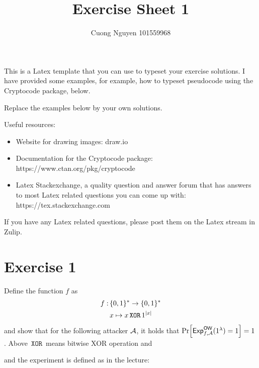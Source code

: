 \documentclass{article}      	%
\author{Cuong Nguyen 101559968}
\title{Exercise Sheet 1}
\newcommand{\xor}{\, \texttt{XOR} \,} %
\begin{document}
         
\maketitle

This is a Latex template that you can use to typeset your exercise solutions. I have provided some examples, for example, how to typeset pseudocode using the Cryptocode package, below.

Replace the examples below by your own solutions.

Useful resources:
\begin{itemize}
    \item Website for drawing images: draw.io
    \item Documentation for the Cryptocode package: https://www.ctan.org/pkg/cryptocode
    \item Latex Stackexchange, a quality question and answer forum that has answers to most Latex related questions you can come up with: https://tex.stackexchange.com
\end{itemize}


If you have any Latex related questions, please post them on the Latex stream in Zulip.

\section*{Exercise 1} 

Define the function $f$ as
\begin{align*}
    f:\, &\bin^* \rightarrow \bin^*\\
    & x \mapsto x\xor 1^{\abs{x}}
\end{align*}
and show that for the following attacker $\mathcal{A}$, it holds that
$\prob{\mathsf{Exp}_{f, \adv}^{\mathsf{OW}}(1^\lambda) = 1} = 1$.
Above $\xor$ means bitwise XOR operation and 

\begin{center}
    \begin{pchstack}
    \procedure{ $\adv(y, 1^{\abs{x}})$ }{ 
        z \leftarrow y \xor 1^{\abs{x}} \\
        \pcreturn z
    }
    \end{pchstack}
\end{center}

and the experiment is defined as in the lecture:
\begin{center}
\end{center}
\end{document}
